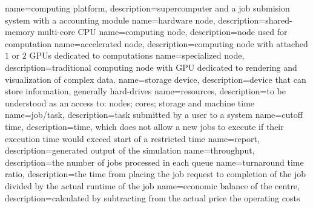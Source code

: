 {
	name={computing platform},
	description={supercomputer and a job submision system with a accounting module}
}
{
	name={hardware node},
	description={shared-memory multi-core CPU}
}
{
	name={computing node},
	description={node used for computation}
}
{
	name={accelerated node},
	description={computing node with attached $1$ or $2$ GPUs dedicated to computations}
}
{
	name={specialized node},
	description={traditional computing node with GPU dedicated to rendering and visualization of complex data.}
}
{
	name={storage device},
	description={device that can store information, generally hard-drives}
}
{
	name={resources},
	description={to be understood as an access to: nodes; cores; storage and machine time}
}
{
	name={job/task},
	description={task submitted by a user to a system}
}
{
	name={cutoff time},
	description={time, which does not allow a new jobs to execute if their execution time would exceed start of a restricted time}
}
{
	name={report},
	description={generated output of the simulation}
}
{
	name={throughput},
	description={the number of jobs processed in each queue}
}
{
	name={turnaround time ratio},
	description={the time from placing the job request to completion  of the job divided by the actual runtime of the job}
}
{
	name={economic balance of the centre},
	description={calculated by subtracting from the actual price the operating costs}
}